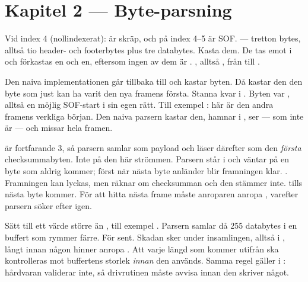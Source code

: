 \section*{Kapitel 2 --- Byte-parsning}

 Vid index 4 (nollindexerat):  är skräp, och  på index 4--5
är SOF.
  --- tretton bytes, alltså tio header- och
footerbytes plus tre databytes.
 Kasta dem. De tas emot i  och förkastas en och en, eftersom ingen av dem
är .
 , alltså , från  till
.

 Den naiva implementationen går tillbaka till  och kastar byten. Då
kastar den den byte som just kan ha varit den nya framens första.
 Stanna kvar i . Byten var , alltså en möjlig SOF-start i sin
egen rätt.
 Till exempel : här är den andra  framens verkliga början.
Den naiva parsern kastar den, hamnar i , ser  --- som inte är
 --- och missar hela framen.

  är fortfarande 3, så parsern samlar  som payload och läser
därefter  som den \emph{första} checksummabyten.
 Inte på den här strömmen. Parsern står i  och väntar på en byte som
aldrig kommer; först när nästa byte anländer blir framningen klar.
 . Framningen kan lyckas, men  räknar om checksumman
och den stämmer inte.
  tills nästa byte kommer. För att hitta nästa frame måste anroparen
anropa , varefter parsern söker efter  igen.

 Sätt  till ett värde större än , till exempel
. Parsern samlar då 255 databytes i en buffert som rymmer färre.
 För sent. Skadan sker under insamlingen, alltså i , långt innan
någon hinner anropa .
 Att varje längd som kommer utifrån ska kontrolleras mot buffertens storlek \emph{innan}
den används. Samma regel gäller  i : hårdvaran validerar inte, så
drivrutinen måste avvisa  innan den skriver något.
